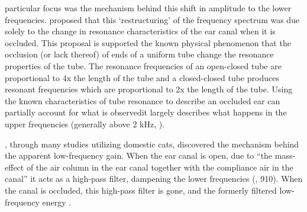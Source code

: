 \DIFaddend particular focus was \DIFaddbegin {}\DIFaddend the mechanism behind this shift in amplitude to the lower frequencies. \cite{huizing:60} proposed that this `restructuring' of the frequency spectrum was due solely to the change in resonance characteristics of the ear canal when it is occluded.  This proposal is supported \DIFaddbegin {}\DIFaddend the known physical phenomenon that the occlusion (or lack thereof) of ends of a uniform tube change the resonance properties of the tube. The resonance frequencies of an open-closed tube are proportional to 4x the length of the tube and a closed-closed tube produces resonant frequencies which are proportional to 2x the length of the tube.  Using the known characteristics of tube resonance to describe an occluded ear can partially account for what is observed\DIFdelbegin \DIFdel{; }\DIFdelend \DIFaddbegin {}\DIFaddend it largely describes what happens in the upper frequencies (generally above 2 kHz, \cite{stenfelt:03}).  

\cite{tonndorf:66}, through many studies utilizing domestic cats,  discovered the mechanism behind the apparent low-frequency gain.  When the ear canal is open, due to ``the mass-effect of the air column in the ear canal together with the compliance \DIFdelbegin {}\DIFdelend \DIFaddbegin {}\DIFaddend air in the \DIFaddbegin {}\DIFaddend canal'' it acts as a high-pass filter, dampening the lower frequencies (\cite{stenfelt:03}, 910).  When the canal is occluded, this high-pass filter is gone, and the formerly filtered low-frequency energy \DIFdelbegin {}\DIFdelend \DIFaddbegin {}\DIFaddend .


